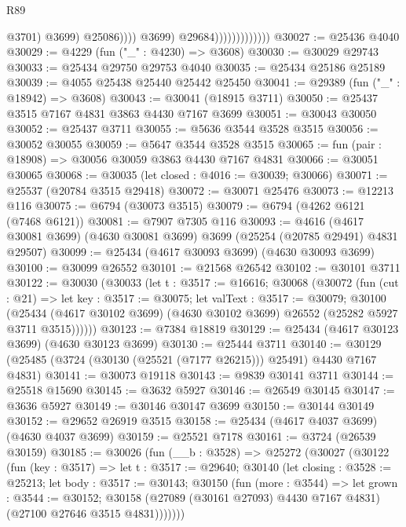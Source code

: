 \begin{lexlean}{R89}
\begin{coremodule}
                                            @3701)
                                          @3699)
                                        @25086))))
                                @3699)
                              @29684)))))))))))))
@30027 := @25436 @4040
@30029 := @4229 (fun ("_" : @4230) => @3608)
@30030 := @30029 @29743
@30033 := @25434 @29750 @29753 @4040
@30035 := @25434 @25186 @25189
@30039 := @4055 @25438 @25440 @25442 @25450
@30041 := @29389 (fun ("_" : @18942) => @3608)
@30043 := @30041 (@18915 @3711)
@30050 := @25437 @3515 @7167 @4831 @3863 @4430 @7167 @3699
@30051 := @30043 @30050
@30052 := @25437 @3711
@30055 := @5636 @3544 @3528 @3515
@30056 := @30052 @30055
@30059 := @5647 @3544 @3528 @3515
@30065 := fun (pair : @18908) => @30056 @30059 @3863 @4430 @7167 @4831
@30066 := @30051 @30065
@30068 := @30035 (let closed : @4016 := @30039; @30066)
@30071 := @25537 (@20784 @3515 @29418)
@30072 := @30071 @25476
@30073 := @12213 @116
@30075 := @6794 (@30073 @3515)
@30079 := @6794 (@4262 @6121 (@7468 @6121))
@30081 := @7907 @7305 @116
@30093 := @4616
    (@4617 @30081 @3699)
    (@4630 @30081 @3699)
    @3699
    (@25254 (@20785 @29491) @4831 @29507)
@30099 := @25434 (@4617 @30093 @3699) (@4630 @30093 @3699)
@30100 := @30099 @26552
@30101 := @21568 @26542
@30102 := @30101 @3711
@30122 := @30030
    (@30033
      (let t : @3517 := @16616;
      @30068
        (@30072
          (fun (cut : @21) =>
          let key : @3517 := @30075;
          let valText : @3517 := @30079;
          @30100
            (@25434 (@4617 @30102 @3699) (@4630 @30102 @3699) @26552 (@25282 @5927 @3711 @3515))))))
@30123 := @7384 @18819
@30129 := @25434 (@4617 @30123 @3699) (@4630 @30123 @3699)
@30130 := @25444 @3711
@30140 := @30129 (@25485 (@3724 (@30130 (@25521 (@7177 @26215))) @25491) @4430 @7167 @4831)
@30141 := @30073 @19118
@30143 := @9839 @30141 @3711
@30144 := @25518 @15690
@30145 := @3632 @5927
@30146 := @26549 @30145
@30147 := @3636 @5927
@30149 := @30146 @30147 @3699
@30150 := @30144 @30149
@30152 := @29652 @26919 @3515
@30158 := @25434 (@4617 @4037 @3699) (@4630 @4037 @3699)
@30159 := @25521 @7178
@30161 := @3724 (@26539 @30159)
@30185 := @30026
    (fun (__b : @3528) =>
    @25272
      (@30027
        (@30122
          (fun (key : @3517) =>
          let t : @3517 := @29640;
          @30140
            (let closing : @3528 := @25213;
            let body : @3517 := @30143;
            @30150
              (fun (more : @3544) =>
              let grown : @3544 := @30152;
              @30158 (@27089 (@30161 @27093) @4430 @7167 @4831) (@27100 @27646 @3515 @4831)))))))

\end{coremodule}
\end{lexlean}
